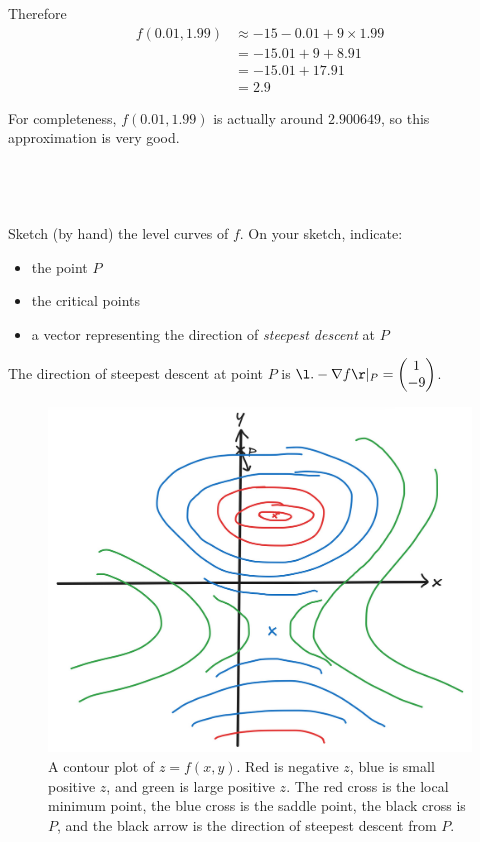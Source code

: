 \documentclass[a4paper]{article}
\begin{document}
Therefore \begin{align*}
f(0.01, 1.99) &\approx -15 - 0.01 + 9 \times 1.99\\
&= -15.01 + 9 + 8.91\\
&= -15.01 + 17.91\\
&= 2.9
\end{align*}

For completeness, $f(0.01, 1.99)$ is actually around $2.900649$, so this approximation is very good.

\subsection{~} %

\begin{questionbody}
Sketch (by hand) the level curves of $f$. On your sketch, indicate: \begin{itemize}[nosep]
\item the point $P$
\item the critical points
\item a vector representing the direction of \textit{steepest descent} at $P$
\end{itemize}
\end{questionbody}

The direction of steepest descent at point $P$ is $\l. -\nabla f \r|_P = \begin{pmatrix}1\\ -9\end{pmatrix}$.

\begin{figure}[h]
    \centering
    \includegraphics[scale=0.4]{Q2c}
    \caption{A contour plot of $z=f(x,y)$. Red is negative $z$, blue is small positive $z$, and green is large positive $z$. The red cross is the local minimum point, the blue cross is the saddle point, the black cross is $P$, and the black arrow is the direction of steepest descent from $P$.}
\end{figure}
\end{document}
